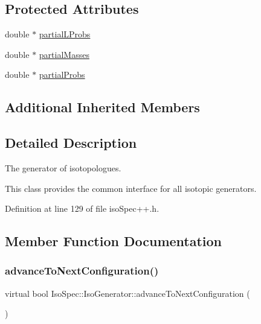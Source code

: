 \subsection*{Protected Attributes}
\begin{DoxyCompactItemize}
\item 
double $\ast$ \mbox{\hyperlink{class_iso_spec_1_1_iso_generator_a54a39b847a71aa08d1207d0666dd62bc}{partial\+L\+Probs}}
\item 
double $\ast$ \mbox{\hyperlink{class_iso_spec_1_1_iso_generator_af5654fcdba8199cbd60668af5de89a53}{partial\+Masses}}
\item 
double $\ast$ \mbox{\hyperlink{class_iso_spec_1_1_iso_generator_ac18406df84b4b220bcb1974000c192b2}{partial\+Probs}}
\end{DoxyCompactItemize}
\subsection*{Additional Inherited Members}


\subsection{Detailed Description}
The generator of isotopologues. 

This class provides the common interface for all isotopic generators. 

Definition at line 129 of file iso\+Spec++.\+h.



\subsection{Member Function Documentation}
\mbox{\label{class_iso_spec_1_1_iso_generator_a20f48ba18c6aecc57d73b2c3ec3a11dd}} 
\subsubsection{\texorpdfstring{advance\+To\+Next\+Configuration()}{advanceToNextConfiguration()}}
{\footnotesize\ttfamily virtual bool Iso\+Spec\+::\+Iso\+Generator\+::advance\+To\+Next\+Configuration (\begin{DoxyParamCaption}{ }\end{DoxyParamCaption})\hspace{0.3cm}{\ttfamily [pure virtual]}}



